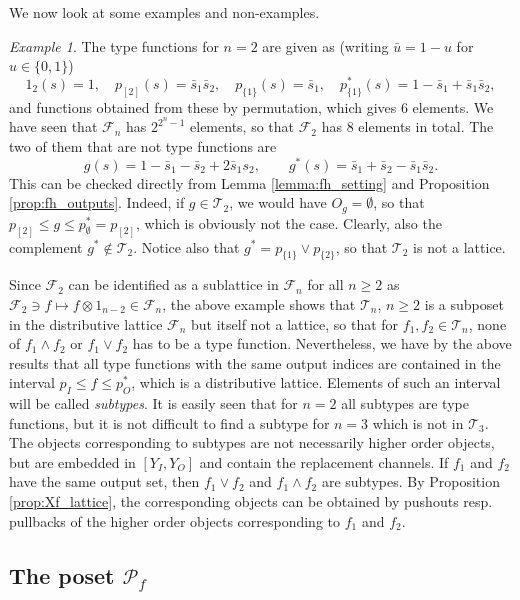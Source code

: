 \documentclass[12pt]{article}
\theoremstyle{definition}
\theoremstyle{remark}
\newtheorem{exm}{Example}
\def\Te{\mathcal T}
\def\Fe{\mathcal F}
\def\Pe{\mathcal P}
\begin{document}
  We now look at some examples and non-examples.

\begin{exm}\label{exm:T2} The type functions for $n=2$ are given as (writing $\bar u=1-u$
for $u\in \{0,1\}$)
\[
1_2(s)=1,\quad p_{[2]}(s)=\bar s_1\bar s_2,\quad p_{\{1\}}(s)=\bar s_1, \quad 
p_{\{1\}}^*(s)= 1-\bar s_1+\bar
s_1\bar s_2,
\]
and functions  obtained from these by permutation, which gives 6 elements.
We have seen that  $\Fe_n$ has $2^{2^n-1}$ elements, so that $\Fe_2$ has 8
elements in total. The two of them that are not type functions are
\[
g(s)=1-\bar s_1-\bar s_2+2\bar s_1s_2,\qquad g^*(s)=\bar s_1+\bar s_2-\bar s_1\bar s_2.
\]
This can be checked directly from Lemma \ref{lemma:fh_setting} and
Proposition \ref{prop:fh_outputs}. Indeed, if $g\in \Te_2$, we would have $O_g=\emptyset$, so that
$p_{[2]}\le g\le p_\emptyset^*=p_{[2]}$, which is obviously not the case. Clearly, also the
complement $g^*\notin \Te_2$. Notice also that $g^*=p_{\{1\}}\vee p_{\{2\}}$, so that
$\Te_2$ is not a lattice. 

\end{exm}

Since $\Fe_2$ can be identified as a sublattice in $\Fe_n$ for
all $n\ge 2$ as $\Fe_2\ni f\mapsto f\otimes 1_{n-2}\in \Fe_n$, the above example shows
that  $\Te_n$, $n\ge 2$ is a  subposet in the distributive lattice 
$\Fe_n$ but itself not a lattice,  so that for $f_1,f_2\in
\Te_n$, none of $f_1\wedge f_2$ or $f_1\vee f_2$ has to be a type function.
Nevertheless, we have by the above results that all type functions with the same output
indices are contained in the interval $p_I\le f\le p_O^*$, which is a distributive
lattice. Elements of such an interval  will be called {\em subtypes}. It is easily seen
that for $n=2$ all subtypes are type functions, but it is not difficult to find a subtype
for $n=3$ which is not in $\Te_3$. The objects corresponding to
subtypes are not necessarily
higher order objects, but are embedded in  $[Y_I,Y_O]$ and contain the replacement
channels. If $f_1$ and $f_2$ have the same output set, then  $f_1\vee f_2$ and $f_1\wedge
f_2$ are subtypes. By Proposition \ref{prop:Xf_lattice}, the corresponding objects can be
obtained by pushouts resp. pullbacks of the higher order objects corresponding to $f_1$
and $f_2$.




\subsection{The poset $\Pe_f$}
\end{document}
